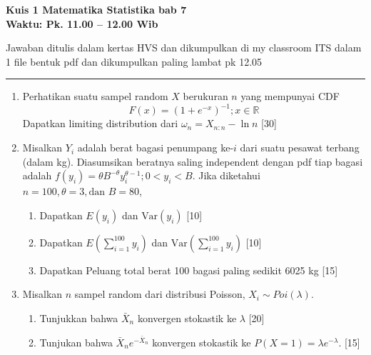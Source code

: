 \documentclass[11pt,letterpaper]{article}
\begin{document}

\begin{center}
  \textbf{\large Kuis 1 Matematika Statistika bab 7} \\
  \vspace{0.3cm}
  \textbf{\large Waktu: Pk. 11.00 -- 12.00 Wib}
\end{center}

\vspace{0.2cm}
\noindent Jawaban ditulis dalam kertas HVS dan dikumpulkan di my classroom ITS dalam 1 file bentuk pdf dan dikumpulkan paling lambat pk 12.05 \\
\rule{\textwidth}{0.5pt}
\vspace{0.2cm}

\begin{enumerate}
  \item Perhatikan suatu sampel random $X$ berukuran $n$ yang mempunyai CDF
  \[ F(x) = (1 + e^{-x})^{-1} ; x \in \mathbb{R} \]
  Dapatkan limiting distribution dari $\omega_n = X_{n:n} - \ln n$ \hfill [30]
  \vspace{0.3cm}

  \item Misalkan $Y_i$ adalah berat bagasi penumpang ke-$i$ dari suatu pesawat terbang (dalam kg). Diasumsikan beratnya saling independent dengan pdf tiap bagasi adalah
  $f(y_i) = \theta B^{-\theta} y_i^{\theta-1} ; 0 < y_i < B$. Jika diketahui $n = 100, \theta = 3, \text{dan } B = 80$,
  \begin{enumerate}[label=\alph*)]
    \item Dapatkan $E(y_i)$ dan $\text{Var}(y_i)$ \hfill [10]
    \item Dapatkan $E\left( \sum_{i=1}^{100} y_i \right)$ dan $\text{Var}\left( \sum_{i=1}^{100} y_i \right)$ \hfill [10]
    \item Dapatkan Peluang total berat 100 bagasi paling sedikit 6025 kg \hfill [15]
  \end{enumerate}
  \vspace{0.3cm}

  \item Misalkan $n$ sampel random dari distribusi Poisson, $X_i \sim Poi(\lambda)$.
  \begin{enumerate}[label=\alph*)]
    \item Tunjukkan bahwa $\bar{X}_n$ konvergen stokastik ke $\lambda$ \hfill [20]
    \item Tunjukan bahwa $\bar{X}_n e^{-\bar{X}_n}$ konvergen stokastik ke $P(X=1) = \lambda e^{-\lambda}$. \hfill [15]
  \end{enumerate}
\end{enumerate}
\end{document}

